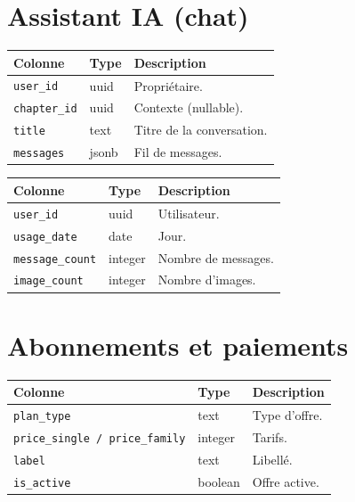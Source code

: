 \section{Assistant IA (chat)}

\begin{longtable}{p{3.6cm}p{2.6cm}p{8cm}}
\toprule \textbf{Colonne} & \textbf{Type} & \textbf{Description} \\ \midrule \endhead
\texttt{user\_id} & uuid & Propriétaire. \\
\texttt{chapter\_id} & uuid & Contexte (nullable). \\
\texttt{title} & text & Titre de la conversation. \\
\texttt{messages} & jsonb & Fil de messages. \\
\bottomrule
\end{longtable}

\begin{longtable}{p{3.6cm}p{2.6cm}p{8cm}}
\toprule \textbf{Colonne} & \textbf{Type} & \textbf{Description} \\ \midrule \endhead
\texttt{user\_id} & uuid & Utilisateur. \\
\texttt{usage\_date} & date & Jour. \\
\texttt{message\_count} & integer & Nombre de messages. \\
\texttt{image\_count} & integer & Nombre d'images. \\
\bottomrule
\end{longtable}

\section{Abonnements et paiements}

\begin{longtable}{p{3.6cm}p{2.6cm}p{8cm}}
\toprule \textbf{Colonne} & \textbf{Type} & \textbf{Description} \\ \midrule \endhead
\texttt{plan\_type} & text & Type d'offre. \\
\texttt{price\_single / price\_family} & integer & Tarifs. \\
\texttt{label} & text & Libellé. \\
\texttt{is\_active} & boolean & Offre active. \\
\bottomrule
\end{longtable}

